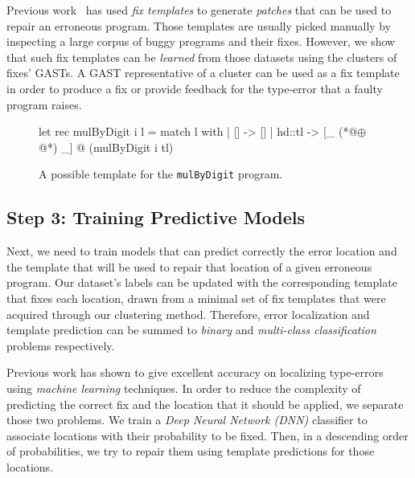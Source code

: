  Previous work~\citep[][]{martinez2013automatically,
martinez2015mining} has used \emph{fix templates} to generate \emph{patches}
that can be used to repair an erroneous program. Those templates are usually
picked manually by inspecting a large corpus of buggy programs and their fixes.
However, we show that such fix templates can be \emph{learned} from those
datasets using the clusters of fixes' GASTs. A GAST representative of a cluster
can be used as a fix template in order to produce a fix or provide feedback for
the type-error that a faulty program raises.


\begin{figure}[ht]
\begin{ecode}
let rec mulByDigit i l =
  match l with
  | []     -> []
  | hd::tl -> [_ (*@$\oplus$@*) _] @ (mulByDigit i tl)
\end{ecode}
\caption{A possible template for the \texttt{mulByDigit} program.}
\label{fig:suggestion}
\end{figure}



\subsection{Step 3: Training Predictive Models}
\label{subsec:step3}

Next, we need to train models that can predict correctly the error location and
the template that will be used to repair that location of a given erroneous
program. Our dataset's labels can be updated with the corresponding template
that fixes each location, drawn from a minimal set of fix templates that were
acquired through our clustering method. Therefore, error localization and
template prediction can be summed to \emph{binary} and \emph{multi-class
classification} problems respectively.

 Previous work has shown to give excellent accuracy
on localizing type-errors using \emph{machine learning} techniques. In order to
reduce the complexity of predicting the correct fix and the location that it
should be applied, we separate those two problems. We train a \emph{Deep Neural
Network (DNN)} classifier to associate locations with their probability to be
fixed. Then, in a descending order of probabilities, we try to repair them using
template predictions for those locations.

